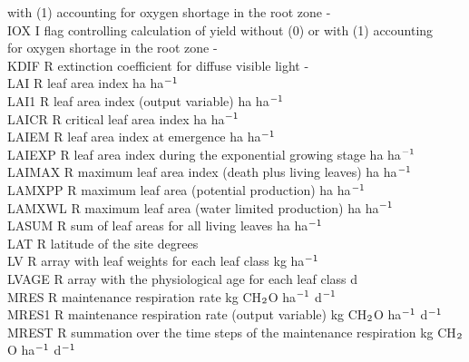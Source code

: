 \begin{tabbing}
\>\> \> with (1) accounting for oxygen shortage in the root zone\> \> \> \> \> \> \> -\\
IOX\> \> I\> flag controlling calculation of yield without (0) or with (1) accounting\\
\>\> \> for oxygen shortage in the root zone\> \> \> \> \> \> \> -\\
KDIF\> \> R\> extinction coefficient for diffuse visible light\> \> \> \> \> \> \> -\\
LAI     \> \> R   \> leaf area index                                    \> \> \> \> \> \> \> ha ha$^{{\rm -1}}$\\
LAI1\> \> R\> leaf area index (output variable)\> \> \> \> \> \> \> ha ha$^{{\rm -1}}$\\
LAICR   \> \> R   \> critical leaf area index                           \> \> \> \> \> \> \> ha ha$^{{\rm -1}}$\\
LAIEM\> \> R\> leaf area index at emergence\> \> \> \> \> \> \> ha ha$^{{\rm -1}}$\\
LAIEXP\> \> R\> leaf area index during the exponential growing stage\> \> \> \> \> \> \> ha ha$^{{\rm -1}}$\\
LAIMAX\> \> R\> maximum leaf area index (death plus living leaves)\> \> \> \> \> \> \> ha ha$^{{\rm -1}}$\\
LAMXPP\> \> R\> maximum leaf area (potential production)\> \> \> \> \> \> \> ha ha$^{{\rm -1}}$\\
LAMXWL\> \> R\> maximum leaf area (water limited production)\> \> \> \> \> \> \> ha ha$^{{\rm -1}}$\\
LASUM   \> \> R   \> sum of leaf areas for all living leaves            \> \> \> \> \> \> \> ha ha$^{{\rm -1}}$\\
LAT\> \> R\> latitude of the site\> \> \> \> \> \> \> degrees\\
LV      \> \> R   \> array with leaf weights for each leaf class        \> \> \> \> \> \> \> kg ha$^{{\rm -1}}$\\
LVAGE   \> \> R   \> array with the physiological age for each leaf class       \> \> \> \> \> \> \> d\\
MRES    \> \> R   \> maintenance respiration rate\> \> \> \> \> \> \> kg CH$_{{\rm 2}}$O ha$^{{\rm -1}}$ d$^{{\rm -1}}$\\
MRES1\> \> R\> maintenance respiration rate (output variable)\> \> \> \> \> \> \> kg CH$_{{\rm 2}}$O ha$^{{\rm -1}}$ d$^{{\rm -1}}$\\
MREST\> \> R\> summation over the time steps of the maintenance respiration\> \> \> \> \> \> \> kg CH$_{{\rm 2}}$O ha$^{{\rm -1}}$ d$^{{\rm -1}}$\\

\end{tabbing}
